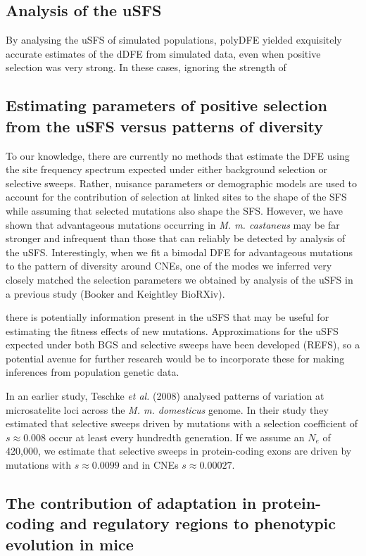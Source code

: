 \documentclass[11pt]{article}
\begin{document}
\subsection{Analysis of the uSFS}

By analysing the uSFS of simulated populations, polyDFE yielded exquisitely accurate estimates of the dDFE from simulated data, even when positive selection was very strong. In these cases, ignoring the strength of 

\subsection*{Estimating parameters of positive selection from the uSFS versus patterns of diversity}

To our knowledge, there are currently no methods that estimate the DFE using the site frequency spectrum expected under either background selection or selective sweeps. Rather, nuisance parameters or demographic models are used to account for the contribution of selection at linked sites to the shape of the SFS while assuming that selected mutations also shape the SFS. 
However, we have shown that advantageous mutations occurring in \textit{M. m. castaneus} may be far stronger and infrequent than those that can reliably be detected by analysis of the uSFS. Interestingly, when we fit a bimodal DFE for advantageous mutations to the pattern of diversity around CNEs, one of the modes we inferred very closely matched the selection parameters we obtained by analysis of the uSFS in a previous study (Booker and Keightley BioRXiv).

there is potentially information present in the uSFS that may be useful for estimating the fitness effects of new mutations. Approximations for the uSFS expected under both BGS and selective sweeps have been developed (REFS), so a potential avenue for further research would be to incorporate these for making inferences from population genetic data.

In an earlier study, Teschke \textit{et al.} (2008) analysed patterns of variation at microsatelite loci across the \textit{M. m. domesticus} genome. In their study they estimated that selective sweeps driven by mutations with a selection coefficient of $s \approx 0.008$ occur at least every hundredth generation. If we assume an $N_e$ of 420,000, we estimate that selective sweeps in protein-coding exons are driven by mutations with $s \approx 0.0099$ and in CNEs $s \approx 0.00027$.


\subsection*{The contribution of adaptation in protein-coding and regulatory regions to phenotypic evolution in mice}
\end{document}
